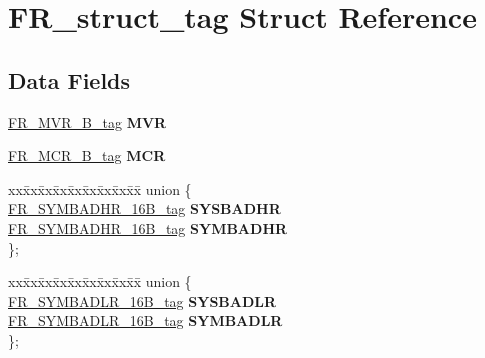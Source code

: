 \hypertarget{structFR__struct__tag}{}\section{F\+R\+\_\+struct\+\_\+tag Struct Reference}
\label{structFR__struct__tag}
\subsection*{Data Fields}
\begin{DoxyCompactItemize}
\item 
\mbox{\label{structFR__struct__tag_aed7f94953e387da5f29368ce85c042b3}} 
\mbox{\hyperlink{unionFR__MVR__16B__tag}{F\+R\+\_\+\+M\+V\+R\+\_\+B\+\_\+tag}} {\bfseries M\+VR}
\item 
\mbox{\label{structFR__struct__tag_abcea839696967e9db52af5728b168cfe}} 
\mbox{\hyperlink{unionFR__MCR__16B__tag}{F\+R\+\_\+\+M\+C\+R\+\_\+B\+\_\+tag}} {\bfseries M\+CR}
\item 
\mbox{\label{structFR__struct__tag_a609a19a19ea2f0ce3eee7ebe70b3c62d}} 
\begin{tabbing}
xx\=xx\=xx\=xx\=xx\=xx\=xx\=xx\=xx\=\kill
union \{\\
\>\mbox{\hyperlink{unionFR__SYMBADHR__16B__tag}{FR\_SYMBADHR\_16B\_tag}} {\bfseries SYSBADHR}\\
\>\mbox{\hyperlink{unionFR__SYMBADHR__16B__tag}{FR\_SYMBADHR\_16B\_tag}} {\bfseries SYMBADHR}\\
\}; \\

\end{tabbing}\item 
\mbox{\label{structFR__struct__tag_a783e03b2f7a275ab9d8302370c2722c4}} 
\begin{tabbing}
xx\=xx\=xx\=xx\=xx\=xx\=xx\=xx\=xx\=\kill
union \{\\
\>\mbox{\hyperlink{unionFR__SYMBADLR__16B__tag}{FR\_SYMBADLR\_16B\_tag}} {\bfseries SYSBADLR}\\
\>\mbox{\hyperlink{unionFR__SYMBADLR__16B__tag}{FR\_SYMBADLR\_16B\_tag}} {\bfseries SYMBADLR}\\
\}; \\


\end{tabbing}
\end{DoxyCompactItemize}
